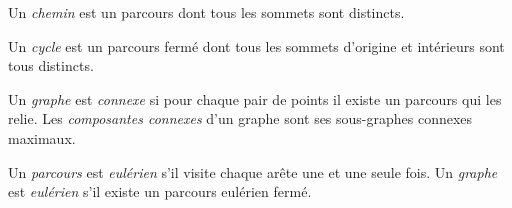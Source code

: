 \begin{mydef}
  Un \emph{chemin} est un parcours dont tous les sommets sont distincts.
\end{mydef}

\begin{mydef}
  Un \emph{cycle} est un parcours fermé dont tous les sommets d'origine et intérieurs sont tous distincts.
\end{mydef}

\begin{mydef}
  Un \emph{graphe} est \emph{connexe} si pour chaque pair de points il existe un parcours qui les relie. Les \emph{composantes connexes} d'un graphe sont ses sous-graphes connexes maximaux.
\end{mydef}

\begin{mydef}
  Un \emph{parcours} est \emph{eulérien} s'il visite chaque arête une et une seule fois. Un \emph{graphe} est \emph{eulérien} s'il existe un parcours eulérien fermé.
\end{mydef}

